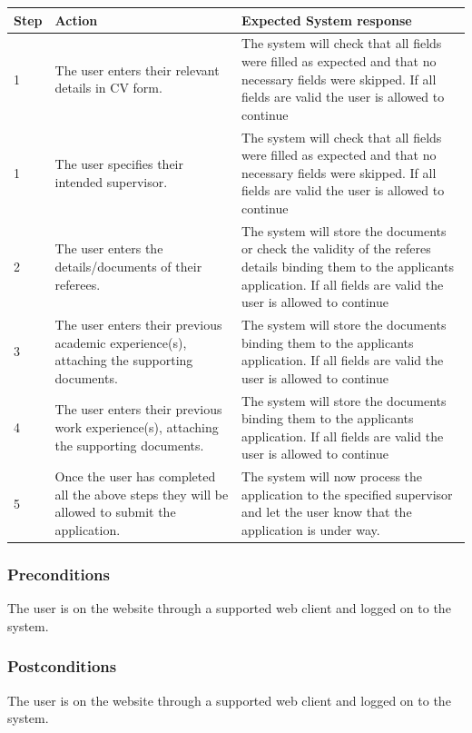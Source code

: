 \documentclass[12pt]{article}
\begin{document}
\begin{center}
\begin{tabular}{|l|p{6cm}|p{8cm}|}
\hline
Step & Action & Expected System response \\
\hline
1 & The user enters their relevant details in CV form.  & The system will check that all fields were filled as expected and that no necessary fields were skipped. If all fields are valid the user is allowed to continue \\
\hline
1 & The user specifies their intended supervisor.  & The system will check that all fields were filled as expected and that no necessary fields were skipped. If all fields are valid the user is allowed to continue \\
\hline
2 & The user enters the details/documents of their referees.  & The system will store the documents or check the validity of the referes details binding them to the applicants application. If all fields are valid the user is allowed to continue \\
\hline
3 & The user enters their previous academic experience(s), attaching the supporting documents.  & The system will store the documents binding them to the applicants application. If all fields are valid the user is allowed to continue \\
\hline
4 & The user enters their previous work experience(s), attaching the supporting documents.  & The system will store the documents binding them to the applicants application. If all fields are valid the user is allowed to continue \\
5 & Once the user has completed all the above steps they will be allowed to submit the application.  & The system will now process the application to the specified supervisor and let the user know that the application is under way. \\
\hline
\end{tabular}
\end{center}

\subsubsection*{Preconditions}
The user is on the website through a supported web client and logged on to the system.

\subsubsection*{Postconditions}
The user is on the website through a supported web client and logged on to the system.
\end{document}
